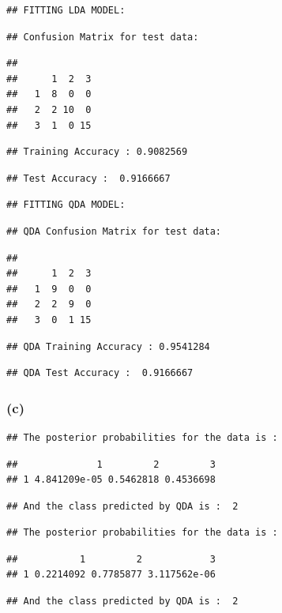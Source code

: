 \documentclass[]{article}
\begin{document}
\begin{verbatim}
## FITTING LDA MODEL:
\end{verbatim}

\begin{verbatim}
## Confusion Matrix for test data:
\end{verbatim}

\begin{verbatim}
##    
##      1  2  3
##   1  8  0  0
##   2  2 10  0
##   3  1  0 15
\end{verbatim}

\begin{verbatim}
## Training Accuracy : 0.9082569
\end{verbatim}

\begin{verbatim}
## Test Accuracy :  0.9166667
\end{verbatim}

\begin{verbatim}
## FITTING QDA MODEL:
\end{verbatim}

\begin{verbatim}
## QDA Confusion Matrix for test data:
\end{verbatim}

\begin{verbatim}
##    
##      1  2  3
##   1  9  0  0
##   2  2  9  0
##   3  0  1 15
\end{verbatim}

\begin{verbatim}
## QDA Training Accuracy : 0.9541284
\end{verbatim}

\begin{verbatim}
## QDA Test Accuracy :  0.9166667
\end{verbatim}

\subsubsection{(c)}\label{c}

\begin{verbatim}
## The posterior probabilities for the data is :
\end{verbatim}

\begin{verbatim}
##              1         2         3
## 1 4.841209e-05 0.5462818 0.4536698
\end{verbatim}

\begin{verbatim}
## And the class predicted by QDA is :  2
\end{verbatim}

\begin{verbatim}
## The posterior probabilities for the data is :
\end{verbatim}

\begin{verbatim}
##           1         2            3
## 1 0.2214092 0.7785877 3.117562e-06
\end{verbatim}

\begin{verbatim}
## And the class predicted by QDA is :  2
\end{verbatim}

~
\end{document}
